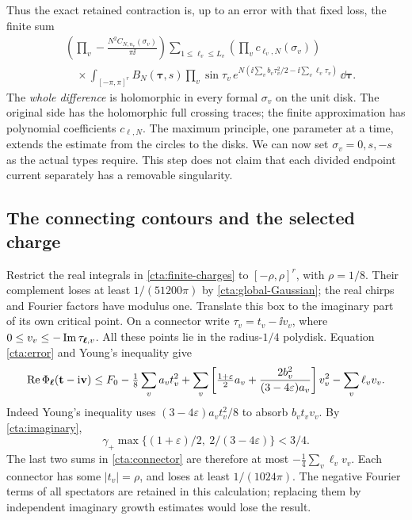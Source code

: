 Thus the exact retained contraction is, up to an error with
that fixed loss, the finite sum
\begin{equation}\label{cta:finite-charges}
 \begin{split}
 &
 \left(\prod_v-\frac{N^2C_{N,n_v}(\sigma_v)}{\pi\ii}\right)
 \sum_{1\le\ell_v\le L_v}\!
     \left(\prod_vc_{\ell_v,N}(\sigma_v)\right)\\
 &\quad\times
     \int_{[-\pi,\pi]^r}B_N(\boldsymbol\tau,s)
          \prod_v\sin\tau_v\,
          e^{N(\ii\sum_v b_v\tau_v^2/2-\ii\sum_v\ell_v\tau_v)}
                     \,\dd\boldsymbol\tau .
 \end{split}
\end{equation}
The \emph{whole difference} is holomorphic in every formal
\(\sigma_v\) on the unit disk. The original side has the
holomorphic full crossing traces; the finite approximation
has polynomial coefficients \(c_{\ell,N}\).
The maximum principle, one parameter at a time, extends the
estimate from the circles to the disks. We can now set
\(\sigma_v=0,s,-s\) as the actual types require. This step
does not claim that each divided endpoint current separately
has a removable singularity.

\subsection{The connecting contours and the selected charge}
Restrict the real integrals in \eqref{cta:finite-charges} to
\([-\rho,\rho]^r\), with \(\rho=1/8\).
Their complement loses at least \(1/(51200\pi)\) by
\eqref{cta:global-Gaussian}; the real chirps and Fourier
factors have modulus one.
Translate this box to the imaginary part of its own critical
point. On a connector write \(\tau_v=t_v-\ii v_v\), where
\(0\le v_v\le-\operatorname{Im}\tau_{\boldsymbol\ell,v}\).
All these points lie in the radius-\(1/4\) polydisk.
Equation \eqref{cta:error} and Young's inequality give
\begin{equation}\label{cta:connector}
 \begin{split}
 \operatorname{Re}\Phi_{\boldsymbol\ell}(\mathbf t-\mathrm i\mathbf v)
 \le F_0-\tfrac18\sum_va_vt_v^2
 +\sum_v\left[
  \tfrac{1+\varepsilon}{2}a_v+
       \frac{2b_v^2}{(3-4\varepsilon)a_v}\right]v_v^2
 -\sum_v\ell_vv_v .
 \end{split}
\end{equation}
Indeed Young's inequality uses
\((3-4\varepsilon)a_vt_v^2/8\) to absorb \(b_vt_vv_v\).
By \eqref{cta:imaginary},
\[
 \gamma_+\max\{(1+\varepsilon)/2,\ 2/(3-4\varepsilon)\}<3/4.
\]
The last two sums in \eqref{cta:connector} are therefore at
most \(-\tfrac14\sum_v\ell_vv_v\). Each connector has some
\(|t_v|=\rho\), and loses at least \(1/(1024\pi)\).
The negative Fourier terms of all spectators are retained
in this calculation; replacing them by independent imaginary
growth estimates would lose the result.

